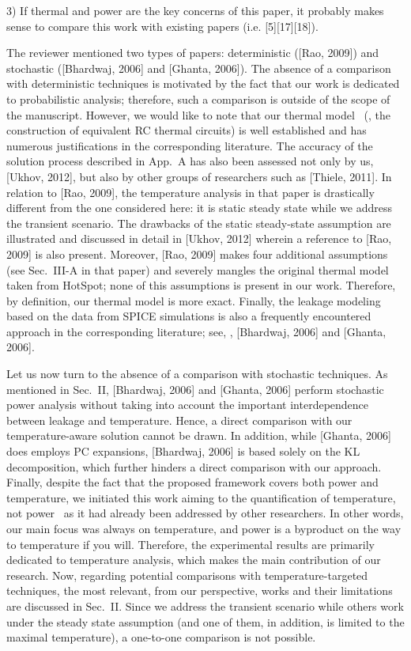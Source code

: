 \begin{reviewer}
3) If thermal and power are the key concerns of this paper, it probably makes sense to compare this work with existing papers (i.e. [5][17][18]).
\end{reviewer}
\begin{authors}
The reviewer mentioned two types of papers: deterministic ([Rao, 2009]) and stochastic ([Bhardwaj, 2006] and [Ghanta, 2006]).
The absence of a comparison with deterministic techniques is motivated by the fact that our work is dedicated to probabilistic analysis; therefore, such a comparison is outside of the scope of the manuscript.
However, we would like to note that our thermal model \perse\ (\ie, the construction of equivalent RC thermal circuits) is well established and has numerous justifications in the corresponding literature.
The accuracy of the solution process described in App.~A has also been assessed not only by us, [Ukhov, 2012], but also by other groups of researchers such as [Thiele, 2011].
In relation to [Rao, 2009], the temperature analysis in that paper is drastically different from the one considered here: it is static steady state while we address the transient scenario.
The drawbacks of the static steady-state assumption are illustrated and discussed in detail in [Ukhov, 2012] wherein a reference to [Rao, 2009] is also present.
Moreover, [Rao, 2009] makes four additional assumptions (see Sec.~III-A in that paper) and severely mangles the original thermal model taken from HotSpot; none of this assumptions is present in our work.
Therefore, by definition, our thermal model is more exact.
Finally, the leakage modeling based on the data from SPICE simulations is also a frequently encountered approach in the corresponding literature; see, \eg, [Bhardwaj, 2006] and [Ghanta, 2006].

Let us now turn to the absence of a comparison with stochastic techniques.
As mentioned in Sec.~II, [Bhardwaj, 2006] and [Ghanta, 2006] perform stochastic power analysis without taking into account the important interdependence between leakage and temperature.
Hence, a direct comparison with our temperature-aware solution cannot be drawn.
In addition, while [Ghanta, 2006] does employs PC expansions, [Bhardwaj, 2006] is based solely on the KL decomposition, which further hinders a direct comparison with our approach.
Finally, despite the fact that the proposed framework covers both power and temperature, we initiated this work aiming to the quantification of temperature, not power \perse\ as it had already been addressed by other researchers.
In other words, our main focus was always on temperature, and power is a byproduct on the way to temperature if you will.
Therefore, the experimental results are primarily dedicated to temperature analysis, which makes the main contribution of our research.
Now, regarding potential comparisons with temperature-targeted techniques, the most relevant, from our perspective, works and their limitations are discussed in Sec.~II.
Since we address the transient scenario while others work under the steady state assumption (and one of them, in addition, is limited to the maximal temperature), a one-to-one comparison is not possible.

\end{authors}
